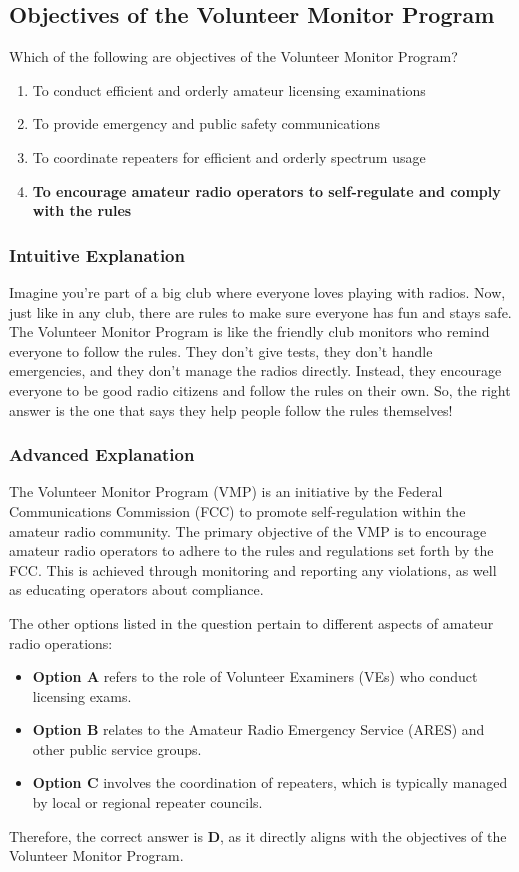 \subsection{Objectives of the Volunteer Monitor Program}
\label{G2D02}

\begin{tcolorbox}[colback=gray!10!white,colframe=black!75!black,title=G2D02]
Which of the following are objectives of the Volunteer Monitor Program?
\begin{enumerate}[label=\Alph*]
    \item To conduct efficient and orderly amateur licensing examinations
    \item To provide emergency and public safety communications
    \item To coordinate repeaters for efficient and orderly spectrum usage
    \item \textbf{To encourage amateur radio operators to self-regulate and comply with the rules}
\end{enumerate}
\end{tcolorbox}

\subsubsection{Intuitive Explanation}
Imagine you're part of a big club where everyone loves playing with radios. Now, just like in any club, there are rules to make sure everyone has fun and stays safe. The Volunteer Monitor Program is like the friendly club monitors who remind everyone to follow the rules. They don't give tests, they don't handle emergencies, and they don't manage the radios directly. Instead, they encourage everyone to be good radio citizens and follow the rules on their own. So, the right answer is the one that says they help people follow the rules themselves!

\subsubsection{Advanced Explanation}
The Volunteer Monitor Program (VMP) is an initiative by the Federal Communications Commission (FCC) to promote self-regulation within the amateur radio community. The primary objective of the VMP is to encourage amateur radio operators to adhere to the rules and regulations set forth by the FCC. This is achieved through monitoring and reporting any violations, as well as educating operators about compliance.

The other options listed in the question pertain to different aspects of amateur radio operations:
\begin{itemize}
    \item \textbf{Option A} refers to the role of Volunteer Examiners (VEs) who conduct licensing exams.
    \item \textbf{Option B} relates to the Amateur Radio Emergency Service (ARES) and other public service groups.
    \item \textbf{Option C} involves the coordination of repeaters, which is typically managed by local or regional repeater councils.
\end{itemize}

Therefore, the correct answer is \textbf{D}, as it directly aligns with the objectives of the Volunteer Monitor Program.

